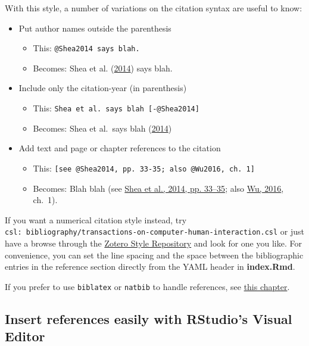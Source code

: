\documentclass[a4paper, nobind]{templates/ociamthesis}
\providecommand{\tightlist}{%
  \setlength{\itemsep}{0pt}\setlength{\parskip}{0pt}}
\begin{document}
With this style, a number of variations on the citation syntax are useful to know:

\begin{itemize}
\tightlist
\item
  Put author names outside the parenthesis

  \begin{itemize}
  \tightlist
  \item
    This: \texttt{@Shea2014\ says\ blah.}
  \item
    Becomes: Shea et al. (\protect\hyperlink{ref-Shea2014}{2014}) says blah.
  \end{itemize}
\item
  Include only the citation-year (in parenthesis)

  \begin{itemize}
  \tightlist
  \item
    This: \texttt{Shea\ et\ al.\ says\ blah\ {[}-@Shea2014{]}}
  \item
    Becomes: Shea et al.~says blah (\protect\hyperlink{ref-Shea2014}{2014})
  \end{itemize}
\item
  Add text and page or chapter references to the citation

  \begin{itemize}
  \tightlist
  \item
    This: \texttt{{[}see\ @Shea2014,\ pp.\ 33-35;\ also\ @Wu2016,\ ch.\ 1{]}}
  \item
    Becomes: Blah blah (see \protect\hyperlink{ref-Shea2014}{Shea et al., 2014, pp. 33--35}; also \protect\hyperlink{ref-Wu2016}{Wu, 2016}, ch.~1).
  \end{itemize}
\end{itemize}

If you want a numerical citation style instead, try \texttt{csl:\ bibliography/transactions-on-computer-human-interaction.csl} or just have a browse through the \href{https://www.zotero.org/styles}{Zotero Style Repository} and look for one you like.
For convenience, you can set the line spacing and the space between the bibliographic entries in the reference section directly from the YAML header in \textbf{index.Rmd}.

If you prefer to use \texttt{biblatex} or \texttt{natbib} to handle references, see \protect\hyperlink{customising-citations}{this chapter}.

\clearpage

\hypertarget{insert-references-easily-with-rstudios-visual-editor}{%
\subsection{Insert references easily with RStudio's Visual Editor}\label{insert-references-easily-with-rstudios-visual-editor}}
\end{document}
